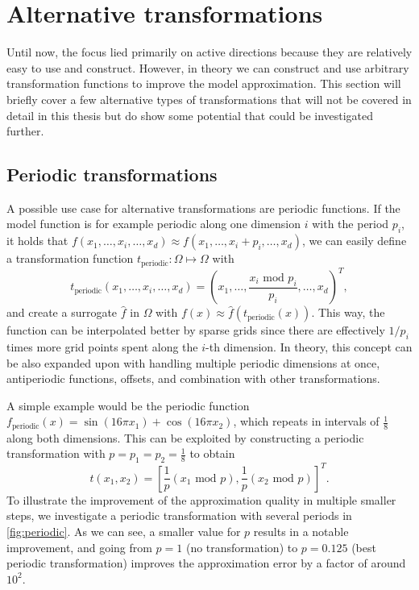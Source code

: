 \documentclass[
  a4paper,  %
  twoside,  %
  bibliography=totoc,
  headsepline,
  cleardoublepage=empty,
  parskip=half,
  draft=false
]{scrbook}
\begin{document}
\section{Alternative transformations}

Until now, the focus lied primarily on active directions because they are relatively easy to use and construct.
However, in theory we can construct and use arbitrary transformation functions to improve the model approximation.
This section will briefly cover a few alternative types of transformations that will not be covered in detail in this thesis but do show some potential that could be investigated further.

\subsection{Periodic transformations}

A possible use case for alternative transformations are periodic functions.
If the model function is for example periodic along one dimension $i$ with the period $p_i$, \ie it holds that $f(x_1,\dots,x_i,\dots,x_d) \approx f(x_1,\dots,x_i + p_i, \dots,x_d)$, we can easily define a transformation function $t_{\text{periodic}} \colon \Omega \mapsto \Omega$ with
\begin{equation}
t_{\text{periodic}}(x_1,\dots,x_i,\dots,x_d) = (x_1,\dots, \frac{x_i\text{ mod } p_i}{p_i}, \dots,x_d)^T,
\label{eq:per}
\end{equation}
and create a surrogate $\hat{f}$ in $\Omega$ with $f(x) \approx \hat{f}(t_{\text{periodic}}(x))$.
This way, the function can be interpolated better by sparse grids since there are effectively $1 / p_i$ times more grid points spent along the $i$-th dimension.
In theory, this concept can be also expanded upon with handling multiple periodic dimensions at once, antiperiodic functions, offsets, and combination with other transformations.

A simple example would be the periodic function $f_{\text{periodic}}(x)=\sin(16\pi x_1)  + \cos(16\pi x_2)$, which repeats in intervals of $\frac{1}{8}$ along both dimensions.
This can be exploited by constructing a periodic transformation with $p=p_1=p_2=\frac{1}{8}$ to obtain
\begin{equation}
t(x_1,x_2) = \left[\frac{1}{p} \left(x_1 \text{ mod } p\right), \frac{1}{p} \left(x_2 \text{ mod } p\right)\right]^T.
\end{equation}
%
To illustrate the improvement of the approximation quality in multiple smaller steps, we investigate a periodic transformation with several periods in \cref{fig:periodic}.
As we can see, a smaller value for $p$ results in a notable improvement, and going from $p=1$ (no transformation) to $p=0.125$ (best periodic transformation) improves the approximation error by a factor of around $10^2$.
\end{document}
